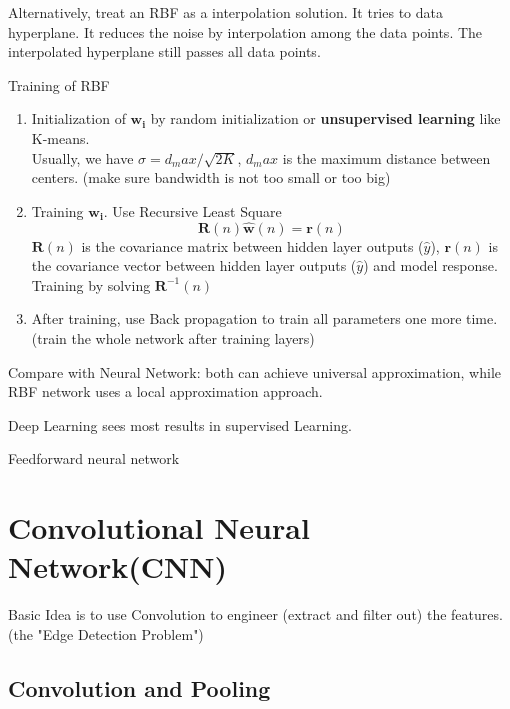 \documentclass[11pt, openany]{book}              %
\begin{document}
Alternatively, treat an RBF as a interpolation solution. It tries to data hyperplane. It reduces the noise by interpolation among the data points. The interpolated hyperplane still passes all data points. 

Training of RBF

\begin{enumerate}
	\item Initialization of $\mathbf{w_i}$ by random initialization or \textbf{unsupervised learning} like K-means. \\ Usually, we have $\sigma = d_max/\sqrt{2K}$, $d_max$ is the maximum distance between centers. (make sure bandwidth is not too small or too big)
	\item Training $\mathbf{w_i}$. Use Recursive Least Square 
	$$\mathbf{R}(n)\mathbf{\hat{w}}(n) = \mathbf{r}(n)$$
	$\mathbf{R}(n)$ is the covariance matrix between hidden layer outputs ($\hat{y}$), $\mathbf{r}(n)$ is the covariance vector between hidden layer outputs ($\hat{y}$) and model response. \\
		Training by solving $\mathbf{R}^{-1}(n)$
	\item After training, use Back propagation to train all parameters one more time. (train the whole network after training layers)
\end{enumerate}

Compare with Neural Network: both can achieve universal approximation, while RBF network uses a local approximation approach. 

Deep Learning sees most results in supervised Learning.

Feedforward neural network 



\section{Convolutional Neural Network(CNN)}

Basic Idea is to use Convolution to engineer (extract and filter out) the features. (the "Edge Detection Problem")

\subsection{Convolution and Pooling}
\end{document}
